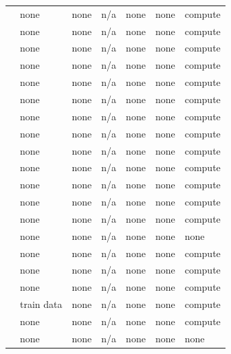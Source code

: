 \begin{landscape}
\begin{longtable}{rllllll}
\cite{BHJK25} & none & none & n/a & none & none & compute \\
\cite{CGH04} & none & none & n/a & none & none & compute \\
\cite{Raz16} & none & none & n/a & none & none & compute \\
\cite{BB20} & none & none & n/a & none & none & compute \\
\cite{ADKPS24} & none & none & n/a & none & none & compute \\
\cite{DTAPZK24} & none & none & n/a & none & none & compute \\
\cite{HKKLMT26} & none & none & n/a & none & none & compute \\
\cite{KMHBCCGRWA20} & none & none & n/a & none & none & compute \\
\cite{BCV16} & none & none & n/a & none & none & compute \\
\cite{GM24} & none & none & n/a & none & none & compute \\
\cite{LOSW24} & none & none & n/a & none & none & compute \\
\cite{Gla24} & none & none & n/a & none & none & compute \\
\cite{JKMS25} & none & none & n/a & none & none & compute \\
\cite{DP20} & none & none & n/a & none & none & none \\
\cite{DQW23} & none & none & n/a & none & none & compute \\
\cite{HG25} & none & none & n/a & none & none & compute \\
\cite{BS21} & none & none & n/a & none & none & compute \\
\cite{KLNRS08} & train data & none & n/a & none & none & compute \\
\cite{ZSWB22} & none & none & n/a & none & none & compute \\
\cite{BLW25} & none & none & n/a & none & none & none \\
\end{longtable}
\endgroup
\end{landscape}

